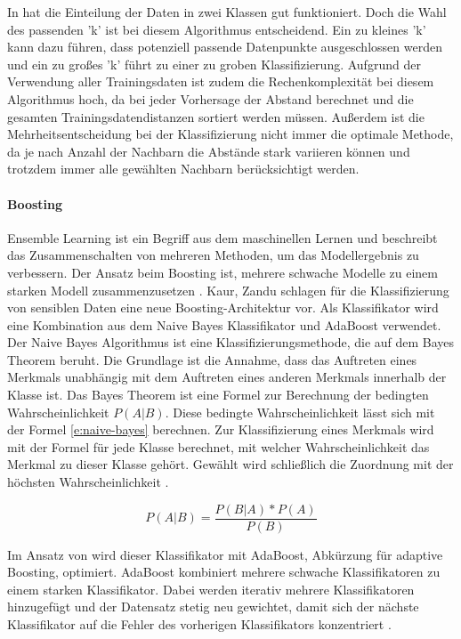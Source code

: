 In \cite{Zardari.2014} hat die Einteilung der Daten in zwei Klassen gut funktioniert. Doch die Wahl des passenden 'k' ist bei diesem Algorithmus entscheidend. Ein zu kleines 'k' kann dazu führen, dass potenziell passende Datenpunkte ausgeschlossen werden und ein zu großes 'k' führt zu einer zu groben Klassifizierung. Aufgrund der Verwendung aller Trainingsdaten ist zudem die Rechenkomplexität bei diesem Algorithmus hoch, da bei jeder Vorhersage der Abstand berechnet und die gesamten Trainingsdatendistanzen sortiert werden müssen. Außerdem ist die Mehrheitsentscheidung bei der Klassifizierung nicht immer die optimale Methode, da je nach Anzahl der Nachbarn die Abstände stark variieren können und trotzdem immer alle gewählten Nachbarn berücksichtigt werden.

\paragraph{Boosting}
Ensemble Learning ist ein Begriff aus dem maschinellen Lernen und beschreibt das Zusammenschalten von mehreren Methoden, um das Modellergebnis zu verbessern. Der Ansatz beim Boosting ist, mehrere schwache Modelle zu einem starken Modell zusammenzusetzen \cite{Frochte.2018c}.
Kaur, Zandu \cite{Kaur.2016} schlagen für die Klassifizierung von sensiblen Daten eine neue Boosting-Architektur vor. Als Klassifikator wird eine Kombination aus dem Naive Bayes Klassifikator und AdaBoost verwendet. Der Naive Bayes Algorithmus ist eine Klassifizierungsmethode, die auf dem Bayes Theorem beruht. Die Grundlage ist die Annahme, dass das Auftreten eines Merkmals unabhängig mit dem Auftreten eines anderen Merkmals innerhalb der Klasse ist. Das Bayes Theorem ist eine Formel zur Berechnung der bedingten Wahrscheinlichkeit ${P(A|B)}$. Diese bedingte Wahrscheinlichkeit lässt sich mit der Formel \ref{e:naive-bayes} berechnen. Zur Klassifizierung eines Merkmals wird mit der Formel für jede Klasse berechnet, mit welcher Wahrscheinlichkeit das Merkmal zu dieser Klasse gehört. Gewählt wird schließlich die Zuordnung mit der höchsten Wahrscheinlichkeit \cite{Frochte.2018d}.

\begin{equation}
    \label{e:naive-bayes}
    P(A|B) = \frac{P(B|A) * P(A)}{P(B)}
\end{equation}

Im Ansatz von \cite{Kaur.2016} wird dieser Klassifikator mit AdaBoost, Abkürzung für adaptive Boosting, optimiert. AdaBoost kombiniert mehrere schwache Klassifikatoren zu einem starken Klassifikator. Dabei werden iterativ mehrere Klassifikatoren hinzugefügt und der Datensatz stetig neu gewichtet, damit sich der nächste Klassifikator auf die Fehler des vorherigen Klassifikators konzentriert \cite{Frochte.2018c}.

